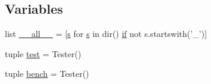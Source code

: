 \subsection*{Variables}
\begin{DoxyCompactItemize}
\item 
list \hyperlink{namespacescipy_1_1optimize_a28f76c1100840cd45451a3dccb385259}{\+\_\+\+\_\+all\+\_\+\+\_\+} = \mbox{[}\hyperlink{indexexpr_8h_ae024b0db549122b44c349ae28ec990dc}{s} for \hyperlink{indexexpr_8h_ae024b0db549122b44c349ae28ec990dc}{s} in dir() \hyperlink{minmax_8h_a30a0ee9fee303f01d9c5e6f669e0dfe9}{if} not s.\+startswith('\+\_\+')\mbox{]}
\item 
tuple \hyperlink{namespacescipy_1_1optimize_a521c732bf624dd18d5c8507070e1a463}{test} = Tester()
\item 
tuple \hyperlink{namespacescipy_1_1optimize_a39d7d2798240bd9e2b90df38c71a3fa1}{bench} = Tester()
\end{DoxyCompactItemize}


